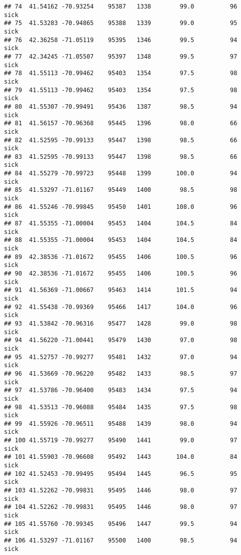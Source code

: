 \documentclass[
]{article}
\begin{document}
\begin{verbatim}
## 74  41.54162 -70.93254    95387   1338        99.0          96         sick
## 75  41.53283 -70.94865    95388   1339        99.0          95         sick
## 76  42.36258 -71.05119    95395   1346        99.5          94         sick
## 77  42.34245 -71.05507    95397   1348        99.5          97         sick
## 78  41.55113 -70.99462    95403   1354        97.5          98         sick
## 79  41.55113 -70.99462    95403   1354        97.5          98         sick
## 80  41.55307 -70.99491    95436   1387        98.5          94         sick
## 81  41.56157 -70.96368    95445   1396        98.0          66         sick
## 82  41.52595 -70.99133    95447   1398        98.5          66         sick
## 83  41.52595 -70.99133    95447   1398        98.5          66         sick
## 84  41.55279 -70.99723    95448   1399       100.0          94         sick
## 85  41.53297 -71.01167    95449   1400        98.5          98         sick
## 86  41.55246 -70.99845    95450   1401       108.0          96         sick
## 87  41.55355 -71.00004    95453   1404       104.5          84         sick
## 88  41.55355 -71.00004    95453   1404       104.5          84         sick
## 89  42.38536 -71.01672    95455   1406       100.5          96         sick
## 90  42.38536 -71.01672    95455   1406       100.5          96         sick
## 91  41.56369 -71.00667    95463   1414       101.5          94         sick
## 92  41.55438 -70.99369    95466   1417       104.0          96         sick
## 93  41.53842 -70.96316    95477   1428        99.0          98         sick
## 94  41.56220 -71.00441    95479   1430        97.0          98         sick
## 95  41.52757 -70.99277    95481   1432        97.0          94         sick
## 96  41.53669 -70.96220    95482   1433        98.5          97         sick
## 97  41.53786 -70.96400    95483   1434        97.5          94         sick
## 98  41.53513 -70.96088    95484   1435        97.5          98         sick
## 99  41.55926 -70.96511    95488   1439        98.0          94         sick
## 100 41.55719 -70.99277    95490   1441        99.0          97         sick
## 101 41.55903 -70.96608    95492   1443       104.0          84         sick
## 102 41.52453 -70.99495    95494   1445        96.5          95         sick
## 103 41.52262 -70.99831    95495   1446        98.0          97         sick
## 104 41.52262 -70.99831    95495   1446        98.0          97         sick
## 105 41.55760 -70.99345    95496   1447        99.5          94         sick
## 106 41.53297 -71.01167    95500   1400        98.5          94         sick

\end{verbatim}
\end{document}
